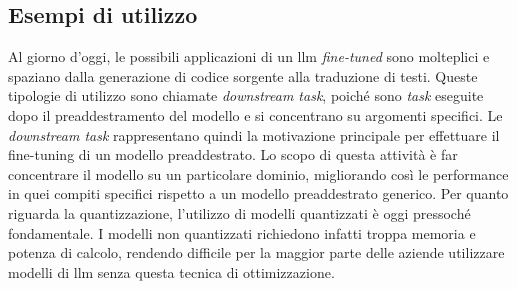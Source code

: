     \subsection{Esempi di utilizzo}
   Al giorno d'oggi, le possibili applicazioni di un \gls{llm} \textit{fine-tuned} sono molteplici e spaziano dalla generazione di codice sorgente alla traduzione di testi. Queste tipologie di utilizzo sono chiamate \textit{downstream task}, poiché sono \textit{task} eseguite dopo il preaddestramento del modello e si concentrano su argomenti specifici. Le \textit{downstream task} rappresentano quindi la motivazione principale per effettuare il \gls{fine-tuning} di un modello preaddestrato. Lo scopo di questa attività è far concentrare il modello su un particolare dominio, migliorando così le performance in quei compiti specifici rispetto a un modello preaddestrato generico.
Per quanto riguarda la quantizzazione, l'utilizzo di modelli quantizzati è oggi pressoché fondamentale. I modelli non quantizzati richiedono infatti troppa memoria e potenza di calcolo, rendendo difficile per la maggior parte delle aziende utilizzare modelli di \gls{llm} senza questa tecnica di ottimizzazione.

